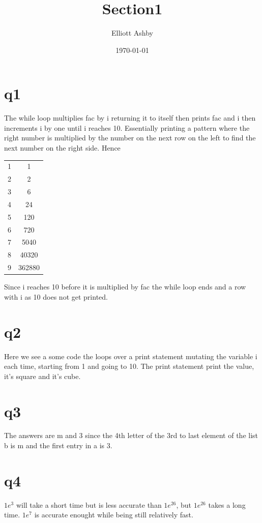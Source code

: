 \documentclass[a4paper,english]{article}
\title{Section1}
\author{Elliott Ashby}
\date{\today}
\begin{document}
    \maketitle
    \section{q1}
    The while loop multiplies fac by i returning it to itself then prints fac and i then increments
    i by one until i reaches 10. Essentially printing a pattern where the right number is multiplied by the 
    number on the next row on the left to find the next number on the right side. Hence \\
    \begin{center}
        \begin{tabular}{ |c|c| }
            1 & 1 \\
            2 & 2 \\
            3 & 6 \\
            4 & 24 \\
            5 & 120 \\
            6 & 720 \\
            7 & 5040 \\
            8 & 40320 \\
            9 & 362880
        \end{tabular}
    \end{center}
    Since i reaches 10 before it is multiplied by fac the while loop ends and a row with i as 10 does not get printed.
    \section{q2}
    
    Here we see a some code the loops over a print statement mutating the variable i each time, starting from 1 and going to 10.
    The print statement print the value, it's square and it's cube.
    \section{q3}
    The answers are m and 3 since the 4th letter of the 3rd to last element of the list b is m and the first entry in a is 3.
    \section{q4} 
    $1e^{3}$ will take a short time but is less accurate than $1e^{26}$, but $1e^{26}$ takes a long time. $1e^{7}$ is accurate enought while being still relatively fast.
\end{document}
